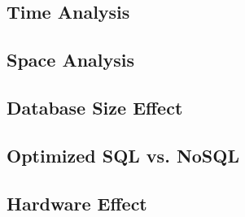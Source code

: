 \subsection{Time Analysis}

\subsection{Space Analysis}

\subsection{Database Size Effect}

\subsection{Optimized SQL vs. NoSQL}

\subsection{Hardware Effect}
